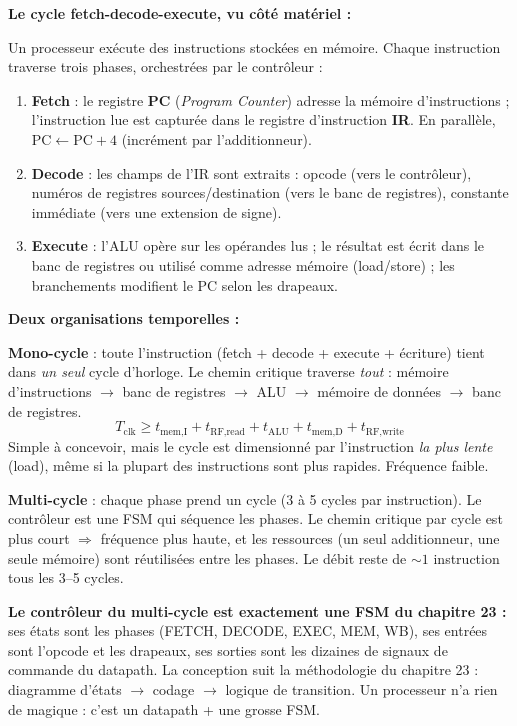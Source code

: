 \documentclass[12pt,a4paper,twoside]{book}
\begin{document}
\begin{formule}
\textbf{Le cycle fetch-decode-execute, vu côté matériel :}

Un processeur exécute des instructions stockées en mémoire. Chaque instruction traverse trois phases, orchestrées par le contrôleur :

\begin{enumerate}[nosep]
\item \textbf{Fetch} : le registre \textbf{PC} (\textit{Program Counter}) adresse la mémoire d'instructions ; l'instruction lue est capturée dans le registre d'instruction \textbf{IR}. En parallèle, $\text{PC} \leftarrow \text{PC} + 4$ (incrément par l'additionneur).
\item \textbf{Decode} : les champs de l'IR sont extraits : opcode (vers le contrôleur), numéros de registres sources/destination (vers le banc de registres), constante immédiate (vers une extension de signe).
\item \textbf{Execute} : l'ALU opère sur les opérandes lus ; le résultat est écrit dans le banc de registres ou utilisé comme adresse mémoire (load/store) ; les branchements modifient le PC selon les drapeaux.
\end{enumerate}
\end{formule}

\begin{formule}
\textbf{Deux organisations temporelles :}

\textbf{Mono-cycle} : toute l'instruction (fetch + decode + execute + écriture) tient dans \textit{un seul} cycle d'horloge. Le chemin critique traverse \textit{tout} : mémoire d'instructions $\to$ banc de registres $\to$ ALU $\to$ mémoire de données $\to$ banc de registres.
\[
T_{\text{clk}} \geq t_{\text{mem,I}} + t_{\text{RF,read}} + t_{\text{ALU}} + t_{\text{mem,D}} + t_{\text{RF,write}}
\]
Simple à concevoir, mais le cycle est dimensionné par l'instruction \textit{la plus lente} (load), même si la plupart des instructions sont plus rapides. Fréquence faible.

\textbf{Multi-cycle} : chaque phase prend un cycle (3 à 5 cycles par instruction). Le contrôleur est une FSM qui séquence les phases. Le chemin critique par cycle est plus court $\Rightarrow$ fréquence plus haute, et les ressources (un seul additionneur, une seule mémoire) sont réutilisées entre les phases. Le débit reste de $\sim 1$ instruction tous les 3--5 cycles.
\end{formule}

\begin{intuition}
\textbf{Le contrôleur du multi-cycle est exactement une FSM du chapitre 23 :} ses états sont les phases (FETCH, DECODE, EXEC, MEM, WB), ses entrées sont l'opcode et les drapeaux, ses sorties sont les dizaines de signaux de commande du datapath. La conception suit la méthodologie du chapitre 23 : diagramme d'états $\to$ codage $\to$ logique de transition. Un processeur n'a rien de magique : c'est un datapath + une grosse FSM.
\end{intuition}
\end{document}
